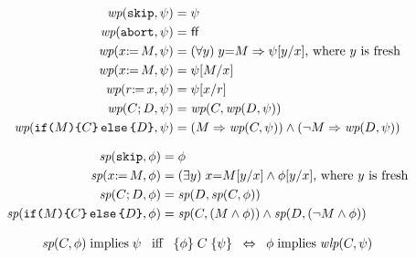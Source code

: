 \begin{align*}
  \textit{wp}(\mathtt{skip},\psi) &= \psi
  \\
  \textit{wp}(\mathtt{abort},\psi) &= \mkern.6mu\mathsf{ff}\mkern.6mu
  \\
  \textit{wp}(x\mathtt{:}\mkern-1mu\mathtt{=}\, M,\psi) &= (\forall y)\; y{=}M \Rightarrow \psi[y/x] \text{, where $y$ is fresh}
  \\
  \textit{wp}(x\mathtt{:}\mkern-1mu\mathtt{=}\, M,\psi) &= \psi[M/x] 
  \\
  \textit{wp}(r\mathtt{:}\mkern-1mu\mathtt{=}\, x,\psi) &= \psi[x/r] 
  \\
  \textit{wp}(C;D,\psi) &= \textit{wp}(C,\textit{wp}(D,\psi))
  \\
  \textit{wp}(\mathtt{if}\allowbreak\texttt{(}M\texttt{)}\allowbreak\texttt{\{} C\texttt{\}}\,\allowbreak\mathtt{else}\allowbreak\,\texttt{\{} D\texttt{\}},\psi) &=
  (M\Rightarrow \textit{wp}(C,\psi)) \land (\lnot M\Rightarrow \textit{wp}(D,\psi))
\end{align*}

\begin{align*}
  \textit{sp}(\mathtt{skip},\phi) &= \phi
  \\
  \textit{sp}(x\mathtt{:}\mkern-1mu\mathtt{=}\, M,\phi) &= (\exists y)\;x{=}M[y/x]  \land \phi[y/x] \text{, where $y$ is fresh}
  \\
  \textit{sp}(C;D,\phi) &= \textit{sp}(D,\textit{sp}(C,\phi))
  \\
  \textit{sp}(\mathtt{if}\allowbreak\texttt{(}M\texttt{)}\allowbreak\texttt{\{} C\texttt{\}}\,\allowbreak\mathtt{else}\allowbreak\,\texttt{\{} D\texttt{\}},\phi) &=
  \textit{sp}(C, (M\land \phi)) \land \textit{sp}(D, (\lnot M\land \phi))
\end{align*}

\begin{align*}
  \fsp(\aCmd,\aForm) \textimplies \bForm
  \;\;\textiff\;\;
  \hoare{\aForm}{\aCmd}{\bForm} %
  \;\;\Leftrightarrow\;\;
  \aForm \textimplies \fwlp(\aCmd,\bForm)
\end{align*}

